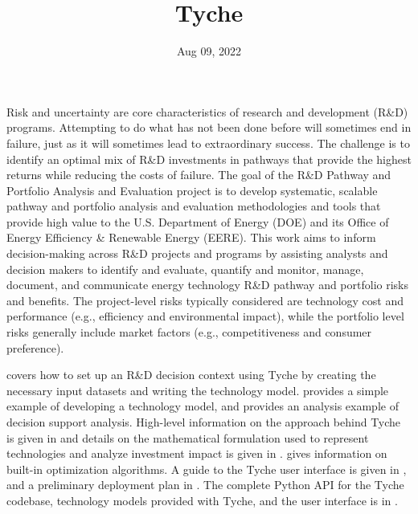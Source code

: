 \documentclass[letterpaper,10pt,english]{sphinxmanual}
\title{Tyche}
\date{Aug 09, 2022}
\author{}
\begin{document}
\pagestyle{empty}
\sphinxmaketitle
\pagestyle{plain}
\sphinxtableofcontents
\pagestyle{normal}
\label{\detokenize{index::doc}}


Risk and uncertainty are core characteristics of research and development (R\&D) programs. Attempting to do what has not been done before will sometimes end in failure, just as it will sometimes lead to extraordinary success. The challenge is to identify an optimal mix of R\&D investments in pathways that provide the highest returns while reducing the costs of failure. The goal of the R\&D Pathway and Portfolio Analysis and Evaluation project is to develop systematic, scalable pathway and portfolio analysis and evaluation methodologies and tools that provide high value to the U.S. Department of Energy (DOE) and its Office of Energy Efficiency \& Renewable Energy (EERE). This work aims to inform decision-making across R\&D projects and programs by assisting analysts and decision makers to identify and evaluate, quantify and monitor, manage, document, and communicate energy technology R\&D pathway and portfolio risks and benefits. The project-level risks typically considered are technology cost and performance (e.g., efficiency and environmental impact), while the portfolio level risks generally include market factors (e.g., competitiveness and consumer preference).

{\hyperref[\detokenize{cheat-sheet:sec-quickstart}]{}} covers how to set up an R\&D decision context using Tyche by creating the necessary input datasets and writing the technology model. {\hyperref[\detokenize{example-technology:sec-techmodelexample}]{}} provides a simple example of developing a technology model, and {\hyperref[\detokenize{example-analysis:sec-analysisexample}]{}} provides an analysis example of decision support analysis. High-level information on the approach behind Tyche is given in {\hyperref[\detokenize{approach:sec-approach}]{}} and details on the mathematical formulation used to represent technologies and analyze investment impact is given in {\hyperref[\detokenize{formulation:sec-formulation}]{}}. {\hyperref[\detokenize{optimizers:sec-optimizers}]{}} gives information on built-in optimization algorithms. A guide to the Tyche user interface is given in {\hyperref[\detokenize{user-interface:sec-userinterface}]{}}, and a preliminary deployment plan in {\hyperref[\detokenize{deployment:sec-deployment}]{}}. The complete Python API for the Tyche codebase, technology models provided with Tyche, and the user interface is in {\hyperref[\detokenize{modules:sec-modules}]{}}.
\end{document}
